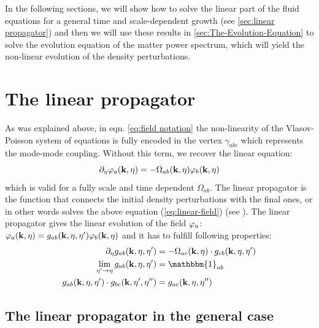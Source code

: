 In the following sections, we will show how to solve the linear part of
the fluid equations for a general time and scale-dependent growth (see \cref{sec:linear propagator})
and then we will use these results in \cref{sec:The-Evolution-Equation} to solve the evolution equation of the 
matter power spectrum, which will yield the non-linear evolution
of the density perturbations.


\section{The linear propagator \label{sec:linear propagator}}

As was explained above, in eqn. \ref{eq:field notation} the non-linearity
of the Vlasov-Poisson system of equations is fully encoded in the
vertex $\gamma_{abc}$ which represents the mode-mode coupling. Without
this term, we recover the linear equation:
\begin{equation}
\partial_{\eta}\varphi_{a}(\mathbf{k},\eta)=-\Omega_{ab}(\mathbf{k},\eta)\varphi_{b}(\mathbf{k},\eta) \label{eq:linear-field}
\end{equation}
which is valid for a fully scale and time dependent $\Omega_{ab}$. 
The linear propagator is the function that connects the initial
density perturbations with the final ones, or in other words solves
the above equation (\ref{eq:linear-field}) (see ).
The linear propagator gives the linear
evolution of the field $\varphi_{a}$:
\beeqc$ 
\varphi_{a}(\mathbf{k},\eta)=g_{ab}(\mathbf{k},\eta,\eta')\varphi_{b}(\mathbf{k},\eta)
$
and it has to fulfill following properties:
\begin{align*}
\pet g_{ab}(\vk k,\eta,\eta') & =-\Omega_{ac}\pkn\cdot g_{cb}(\vk k,\eta,\eta')\\
\lim_{\eta'\rightarrow\eta}g_{ab}(\vk k,\eta,\eta') & =\mathbbm{1}_{ab}\\
g_{ab}(\vk k,\eta,\eta')\cdot g_{bc}(\vk k,\eta',\eta'') & =g_{ac}(\vk k,\eta,\eta'')
\end{align*}

\subsection{The linear propagator in the general case}

